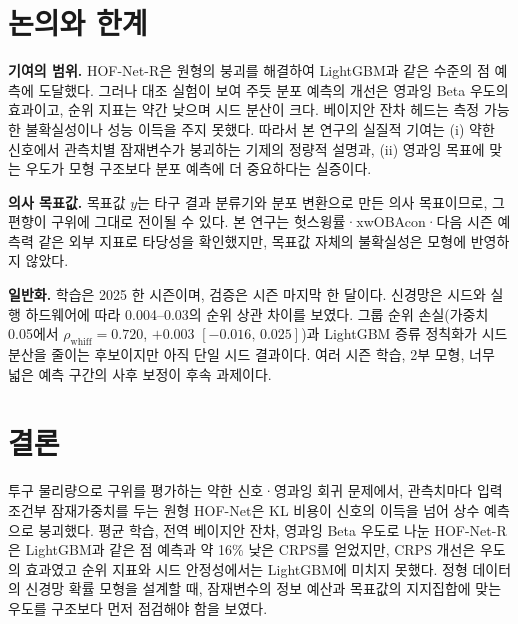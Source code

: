 \documentclass[journal,a4paper,10pt]{IEEEtran}
\begin{document}
\section{논의와 한계}
\label{sec:discussion}

\textbf{기여의 범위.} HOF-Net-R은 원형의 붕괴를 해결하여 LightGBM과 같은 수준의 점 예측에 도달했다. 그러나 대조 실험이 보여 주듯 분포 예측의 개선은 영과잉 Beta 우도의 효과이고, 순위 지표는 약간 낮으며 시드 분산이 크다. 베이지안 잔차 헤드는 측정 가능한 불확실성이나 성능 이득을 주지 못했다. 따라서 본 연구의 실질적 기여는 (i) 약한 신호에서 관측치별 잠재변수가 붕괴하는 기제의 정량적 설명과, (ii) 영과잉 목표에 맞는 우도가 모형 구조보다 분포 예측에 더 중요하다는 실증이다.

\textbf{의사 목표값.} 목표값 $y$는 타구 결과 분류기와 분포 변환으로 만든 의사 목표이므로, 그 편향이 구위에 그대로 전이될 수 있다. 본 연구는 헛스윙률·xwOBAcon·다음 시즌 예측력 같은 외부 지표로 타당성을 확인했지만, 목표값 자체의 불확실성은 모형에 반영하지 않았다.

\textbf{일반화.} 학습은 2025 한 시즌이며, 검증은 시즌 마지막 한 달이다. 신경망은 시드와 실행 하드웨어에 따라 0.004–0.03의 순위 상관 차이를 보였다. 그룹 순위 손실(가중치 0.05에서 $\rho_{\mathrm{whiff}}=0.720$, $+0.003$ $[-0.016,\,0.025]$)과 LightGBM 증류 정칙화가 시드 분산을 줄이는 후보이지만 아직 단일 시드 결과이다. 여러 시즌 학습, 2부 모형, 너무 넓은 예측 구간의 사후 보정이 후속 과제이다.

\section{결론}
\label{sec:conclusion}
투구 물리량으로 구위를 평가하는 약한 신호·영과잉 회귀 문제에서, 관측치마다 입력 조건부 잠재가중치를 두는 원형 HOF-Net은 KL 비용이 신호의 이득을 넘어 상수 예측으로 붕괴했다. 평균 학습, 전역 베이지안 잔차, 영과잉 Beta 우도로 나눈 HOF-Net-R은 LightGBM과 같은 점 예측과 약 16\% 낮은 CRPS를 얻었지만, CRPS 개선은 우도의 효과였고 순위 지표와 시드 안정성에서는 LightGBM에 미치지 못했다. 정형 데이터의 신경망 확률 모형을 설계할 때, 잠재변수의 정보 예산과 목표값의 지지집합에 맞는 우도를 구조보다 먼저 점검해야 함을 보였다.




\appendices
\end{document}
